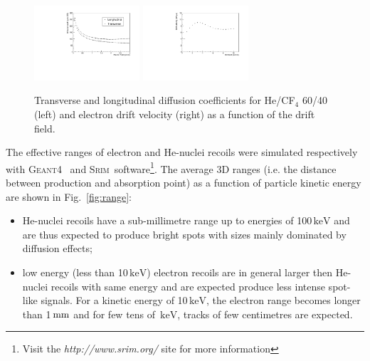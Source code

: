 \documentclass[physics,article,submit,moreauthors,pdftex]{Definitions/mdpi}
\newcommand{\GEANT} {{\textsc{Geant4}}\xspace}
\newcommand{\SRIM} {{\textsc{Srim}}\xspace}
\newcommand{\unit}[1]{\ensuremath{\textrm{\,#1}}\xspace}
\newcommand{\keV}{\ensuremath{\,\textrm{keV}}\xspace}
\begin{document}
\begin{figure}[t!]
\centering
\includegraphics[width=0.35\textwidth]{diff6040_zoom.pdf}
\includegraphics[width=0.35\textwidth]{vdrift6040.pdf}
\caption{Transverse and longitudinal diffusion coefficients for He/CF$_{4}$ 60/40 (left) and electron drift velocity (right) as a function of the drift field.}
\label{fig:diff_vdrift}
\end{figure}


 
The effective ranges of electron and He-nuclei recoils were simulated
respectively with \GEANT~\cite{bib:geant} and
 \SRIM~software\footnote{Visit the {\it http://www.srim.org/} site for more information}. The average 3D ranges (i.e. the distance between production and absorption point) as a function of particle kinetic energy are shown in Fig.~\ref{fig:range}:
 \begin{itemize}
     \item He-nuclei recoils have a sub-millimetre range up to energies
       of 100\keV and are thus expected to produce bright spots with
       sizes mainly dominated by diffusion effects;
     \item low energy (less than 10\keV) electron recoils are in
       general larger then He-nuclei recoils with same energy and are
       expected produce less intense spot-like signals. For a kinetic
       energy of 10\keV, the electron range becomes longer than
       1\unit{mm} and for few tens of \keV, tracks of few centimetres
       are expected.
 \end{itemize}
\end{document}
